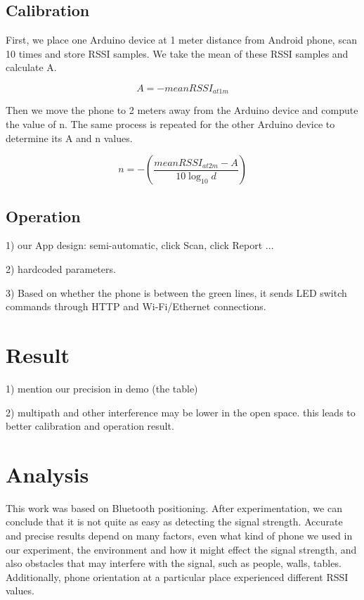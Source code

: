 \documentclass[conference,a4paper]{../../sty/IEEEtran}
\begin{document}
\subsection{Calibration}

First, we place one Arduino device at 1 meter distance from Android phone, scan 10 times and store RSSI samples.
We take the mean of these RSSI samples and calculate A.

\begin{equation}
 A = -meanRSSI_{at 1m}
\end{equation}

Then we move the phone to 2 meters away from the Arduino device and compute the value of n.
The same process is repeated for the other Arduino device to determine its A and n values.

\begin{equation}
 n = -(\frac{ meanRSSI_{at 2m}-A}{10 \log_{10}d})
\end{equation}


\subsection{Operation}

1) our App design: semi-automatic, click Scan, click Report ...

2) hardcoded parameters.

3) Based on whether the phone is between the green lines, it sends LED switch commands through HTTP and Wi-Fi/Ethernet connections.


\section{Result}

1) mention our precision in demo (the table)

2) multipath and other interference may be lower in the open space. this leads to better calibration and operation result.

\section{Analysis}

This work was based on Bluetooth positioning. After experimentation, we can conclude that it is not quite as easy as detecting the signal strength. Accurate and precise results depend on many factors, even what kind of phone we used in our experiment, the environment and how it might effect the signal strength, and also obstacles that may interfere with the signal, such as people, walls, tables. Additionally, phone orientation at a particular place experienced different RSSI values.
\end{document}
